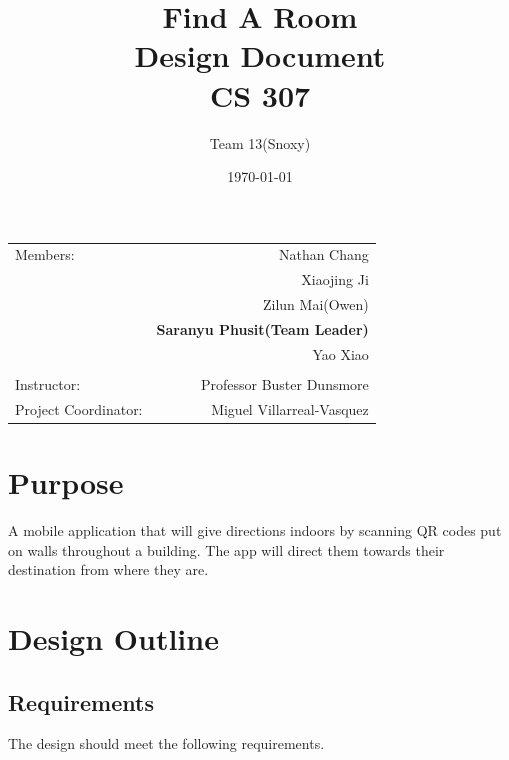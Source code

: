 \documentclass[12pt]{article}
\title{\textbf{Find A Room} \\ Design Document \\ CS 307} %
\author{Team \textsc{13}(Snoxy)} %
\date{\today} %
\begin{document}
\maketitle %

\begin{center}
\begin{tabular}{l r}
Members: & Nathan Chang \\ %
& Xiaojing Ji \\
& Zilun Mai(Owen) \\
& \textbf{Saranyu Phusit(Team Leader)} \\
& Yao Xiao \\
\\
\bigskip
Instructor: & Professor Buster Dunsmore \\%
Project Coordinator: & Miguel Villarreal-Vasquez %

\end{tabular}
\end{center}

\newpage
\tableofcontents




\newpage
\section{Purpose}

A mobile application that will give directions indoors by scanning QR codes put on walls throughout a building. The app will direct them towards their destination from where they are.


\section{Design Outline}

\subsection{Requirements}
The design should meet the following requirements.
\end{document}
